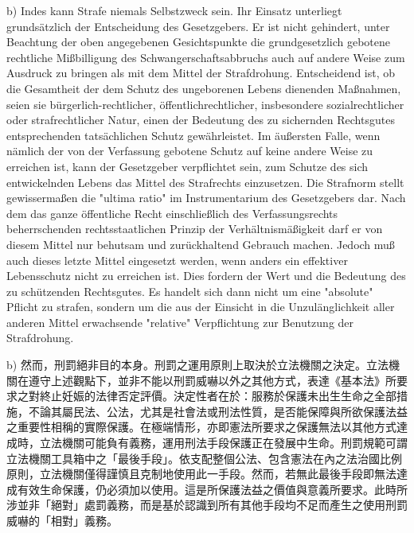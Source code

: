 \documentclass[12pt]{article}
\begin{document}
\syncleft
\begin{sourcepara}
b) Indes kann Strafe niemals Selbstzweck sein. Ihr Einsatz unterliegt grundsätzlich der Entscheidung des Gesetzgebers. Er ist nicht gehindert, unter Beachtung der oben angegebenen Gesichtspunkte die grundgesetzlich gebotene rechtliche Mißbilligung des Schwangerschaftsabbruchs auch auf andere Weise zum Ausdruck zu bringen als mit dem Mittel der Strafdrohung. Entscheidend ist, ob die Gesamtheit der dem Schutz des ungeborenen Lebens dienenden Maßnahmen, seien sie bürgerlich-rechtlicher, öffentlichrechtlicher, insbesondere sozialrechtlicher oder strafrechtlicher Natur, einen der Bedeutung des zu sichernden Rechtsgutes entsprechenden tatsächlichen Schutz gewährleistet. Im äußersten Falle, wenn nämlich der von der Verfassung gebotene Schutz auf keine andere Weise zu erreichen ist, kann der Gesetzgeber verpflichtet sein, zum Schutze des sich entwickelnden Lebens das Mittel des Strafrechts einzusetzen. Die Strafnorm stellt gewissermaßen die "ultima ratio" im Instrumentarium des Gesetzgebers dar. Nach dem das ganze öffentliche Recht einschließlich des Verfassungsrechts beherrschenden rechtsstaatlichen Prinzip der Verhältnismäßigkeit darf er von diesem Mittel nur behutsam und zurückhaltend Gebrauch machen. Jedoch muß auch dieses letzte Mittel eingesetzt werden, wenn anders ein effektiver Lebensschutz nicht zu erreichen ist. Dies fordern der Wert und die Bedeutung des zu schützenden Rechtsgutes. Es handelt sich dann nicht um eine "absolute" Pflicht zu strafen, sondern um die aus der Einsicht in die Unzulänglichkeit aller anderen Mittel erwachsende "relative" Verpflichtung zur Benutzung der Strafdrohung.
\end{sourcepara}
\begin{transpara}
b) 然而，刑罰絕非目的本身。刑罰之運用原則上取決於立法機關之決定。立法機關在遵守上述觀點下，並非不能以刑罰威嚇以外之其他方式，表達《基本法》所要求之對終止妊娠的法律否定評價。決定性者在於：服務於保護未出生生命之全部措施，不論其屬民法、公法，尤其是社會法或刑法性質，是否能保障與所欲保護法益之重要性相稱的實際保護。在極端情形，亦即憲法所要求之保護無法以其他方式達成時，立法機關可能負有義務，運用刑法手段保護正在發展中生命。刑罰規範可謂立法機關工具箱中之「最後手段」。依支配整個公法、包含憲法在內之法治國比例原則，立法機關僅得謹慎且克制地使用此一手段。然而，若無此最後手段即無法達成有效生命保護，仍必須加以使用。這是所保護法益之價值與意義所要求。此時所涉並非「絕對」處罰義務，而是基於認識到所有其他手段均不足而產生之使用刑罰威嚇的「相對」義務。
\end{transpara}
\end{document}
